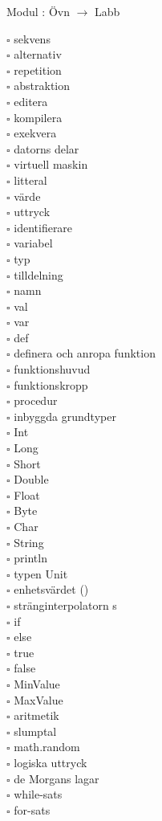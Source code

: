
    Modul : Övn  $\rightarrow$ Labb 
    \begin{multicols}{3}\SlideFontTiny
    $\square$ sekvens \\
$\square$ alternativ \\
$\square$ repetition \\
$\square$ abstraktion \\
$\square$ editera \\
$\square$ kompilera \\
$\square$ exekvera \\
$\square$ datorns delar \\
$\square$ virtuell maskin \\
$\square$ litteral \\
$\square$ värde \\
$\square$ uttryck \\
$\square$ identifierare \\
$\square$ variabel \\
$\square$ typ \\
$\square$ tilldelning \\
$\square$ namn \\
$\square$ val \\
$\square$ var \\
$\square$ def \\
$\square$ definera och anropa funktion \\
$\square$ funktionshuvud \\
$\square$ funktionskropp \\
$\square$ procedur \\
$\square$ inbyggda grundtyper \\
$\square$ Int \\
$\square$ Long \\
$\square$ Short \\
$\square$ Double \\
$\square$ Float \\
$\square$ Byte \\
$\square$ Char \\
$\square$ String \\
$\square$ println \\
$\square$ typen Unit \\
$\square$ enhetsvärdet () \\
$\square$ stränginterpolatorn s \\
$\square$ if \\
$\square$ else \\
$\square$ true \\
$\square$ false \\
$\square$ MinValue \\
$\square$ MaxValue \\
$\square$ aritmetik \\
$\square$ slumptal \\
$\square$ math.random \\
$\square$ logiska uttryck \\
$\square$ de Morgans lagar \\
$\square$ while-sats \\
$\square$ for-sats \\
    \end{multicols}
    